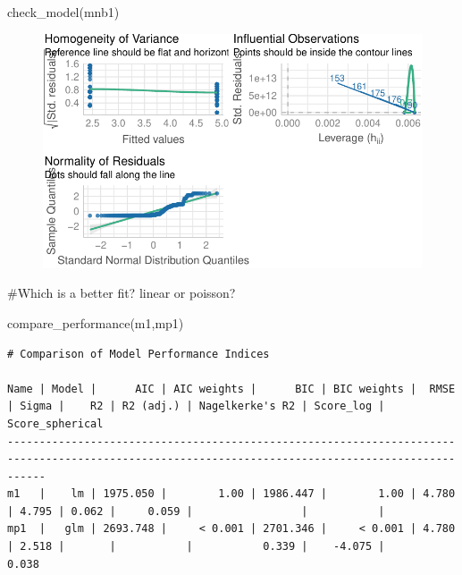 \documentclass[
  letterpaper,
  DIV=11,
  numbers=noendperiod]{scrreprt}
\newenvironment{Shaded}{\begin{snugshade}}{\end{snugshade}}
\newcommand{\CommentTok}[1]{\textcolor[rgb]{0.37,0.37,0.37}{#1}}
\newcommand{\FunctionTok}[1]{\textcolor[rgb]{0.28,0.35,0.67}{#1}}
\newcommand{\NormalTok}[1]{\textcolor[rgb]{0.00,0.23,0.31}{#1}}
\begin{document}
\begin{Shaded}
\begin{Highlighting}[]
\FunctionTok{check\_model}\NormalTok{(mnb1)}
\end{Highlighting}
\end{Shaded}

\begin{figure}[H]

{\centering \includegraphics{analysis/SGC3A/4_sgc3A_hypotesting_files/figure-pdf/MODEL-ABSCORE-NEGBINOM-1.pdf}

}

\end{figure}

\begin{Shaded}
\begin{Highlighting}[]
\CommentTok{\#Which is a better fit? linear or poisson?}

\FunctionTok{compare\_performance}\NormalTok{(m1,mp1)}
\end{Highlighting}
\end{Shaded}

\begin{verbatim}
# Comparison of Model Performance Indices

Name | Model |      AIC | AIC weights |      BIC | BIC weights |  RMSE | Sigma |    R2 | R2 (adj.) | Nagelkerke's R2 | Score_log | Score_spherical
--------------------------------------------------------------------------------------------------------------------------------------------------
m1   |    lm | 1975.050 |        1.00 | 1986.447 |        1.00 | 4.780 | 4.795 | 0.062 |     0.059 |                 |           |                
mp1  |   glm | 2693.748 |     < 0.001 | 2701.346 |     < 0.001 | 4.780 | 2.518 |       |           |           0.339 |    -4.075 |           0.038
\end{verbatim}
\end{document}
